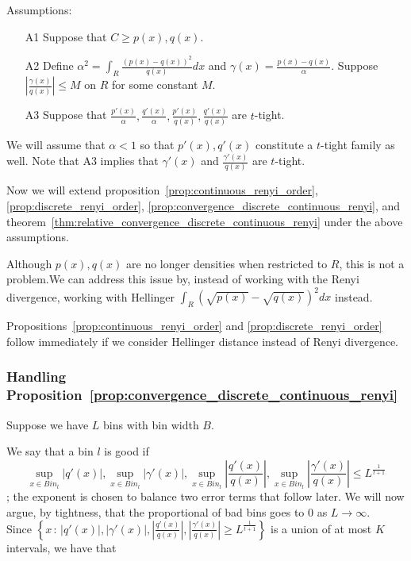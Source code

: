 \documentclass{article}
\begin{document}
Assumptions:
\begin{enumerate}
\item[A1] Suppose that $C \geq p(x), q(x) $.
\item[A2] Define $\alpha^2 = \int_R \frac{(p(x) - q(x))^2}{q(x)} dx$ and $\gamma(x) = \frac{p(x) - q(x)}{\alpha}$. Suppose $\left| \frac{\gamma(x)}{q(x)} \right| \leq M$ on $R$ for some constant $M$.
\item[A3] Suppose that $\frac{p'(x)}{\alpha}, \frac{q'(x)}{\alpha}, \frac{p'(x)}{q(x)}, \frac{q'(x)}{q(x)}$ are $t$-tight. 
\end{enumerate}

We will assume that $\alpha < 1$ so that $p'(x), q'(x)$ constitute a $t$-tight family as well. Note that A3 implies that $\gamma'(x)$ and $\frac{\gamma'(x)}{q(x)}$ are $t$-tight.

Now we will extend proposition~\ref{prop:continuous_renyi_order}, \ref{prop:discrete_renyi_order}, \ref{prop:convergence_discrete_continuous_renyi}, and theorem~\ref{thm:relative_convergence_discrete_continuous_renyi} under the above assumptions.

Although $p(x), q(x)$ are no longer densities when restricted to $R$, this is not a problem.We can address this issue by, instead of working with the Renyi divergence, working with Hellinger $\int_R (\sqrt{p(x)}-\sqrt{q(x)})^2 dx$ instead. 

Propositions~\ref{prop:continuous_renyi_order} and \ref{prop:discrete_renyi_order} follow immediately if we consider Hellinger distance instead of Renyi divergence. 

\subsubsection{Handling Proposition~\ref{prop:convergence_discrete_continuous_renyi}}

Suppose we have $L$ bins with bin width $B$. 

We say that a bin $l$ is good if 
$$
\sup_{x \in Bin_l} |q'(x)|, \sup_{x \in Bin_l} |\gamma'(x)|, 
\sup_{x \in Bin_l} \left| \frac{q'(x)}{q(x)} \right|, 
\sup_{x \in Bin_l} \left| \frac{\gamma'(x)}{q(x)} \right| \leq L^{\frac{1}{t+1}}
$$; 
the exponent is chosen to balance two error terms that follow later. We will now argue, by tightness, that the proportional of bad bins goes to 0 as $L \rightarrow \infty$.\\

Since $\left \{x \,:\, |q'(x)|, |\gamma'(x)|, |\frac{q'(x)}{q(x)}|, |\frac{\gamma'(x)}{q(x)}| \geq L^{\frac{1}{t+1}} \right \}$ is a union of at most $K$ intervals, we have that
\end{document}
